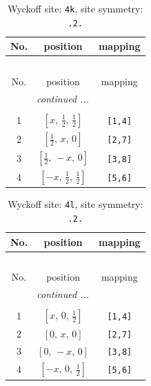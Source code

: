 \documentclass[fleqn,8pt]{jsarticle}
\begin{document}
\renewcommand{\arraystretch}{1.2}
\begin{longtable}{ccc}
\caption{Wyckoff site: {\tt 4k}, site symmetry: {\tt .2.}}
 \\
 \hline \hline
No. & position & mapping \\ \hline \endfirsthead

\multicolumn{2}{l}{\tablename\ \thetable{}} \\
 \hline \hline
No. & position & mapping \\ \hline \endhead

 \hline \hline
\multicolumn{2}{r}{\footnotesize\it continued ...} \\ \endfoot

 \hline \hline
\multicolumn{2}{r}{} \\ \endlastfoot

1 & $\left[ x,\, \frac{1}{2},\, \frac{1}{2} \right]$ & {\tt [1,4]} \\ \hline
2 & $\left[ \frac{1}{2},\, x,\, 0 \right]$ & {\tt [2,7]} \\ \hline
3 & $\left[ \frac{1}{2},\, - x,\, 0 \right]$ & {\tt [3,8]} \\ \hline
4 & $\left[ - x,\, \frac{1}{2},\, \frac{1}{2} \right]$ & {\tt [5,6]} \\
\end{longtable}
\renewcommand{\arraystretch}{1.2}
\begin{longtable}{ccc}
\caption{Wyckoff site: {\tt 4l}, site symmetry: {\tt .2.}}
 \\
 \hline \hline
No. & position & mapping \\ \hline \endfirsthead

\multicolumn{2}{l}{\tablename\ \thetable{}} \\
 \hline \hline
No. & position & mapping \\ \hline \endhead

 \hline \hline
\multicolumn{2}{r}{\footnotesize\it continued ...} \\ \endfoot

 \hline \hline
\multicolumn{2}{r}{} \\ \endlastfoot

1 & $\left[ x,\, 0,\, \frac{1}{2} \right]$ & {\tt [1,4]} \\ \hline
2 & $\left[ 0,\, x,\, 0 \right]$ & {\tt [2,7]} \\ \hline
3 & $\left[ 0,\, - x,\, 0 \right]$ & {\tt [3,8]} \\ \hline
4 & $\left[ - x,\, 0,\, \frac{1}{2} \right]$ & {\tt [5,6]} \\
\end{longtable}
\end{document}
